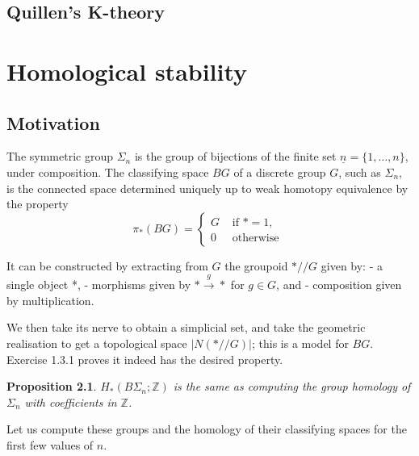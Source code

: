 \documentclass{book}
\newtheorem{prop}{Proposition}
\begin{document}
\section{Quillen's K-theory}



\chapter{Homological stability}

\section{Motivation}

The symmetric group $\Sigma_n$ is the group of bijections of the finite set $\underline{n}=\{1, \ldots, n\}$, under composition. The classifying space $B G$ of a discrete group $G$, such as $\Sigma_n$, is the connected space determined uniquely up to weak homotopy equivalence by the property
$$
\pi_*(B G)= \begin{cases}G & \text { if } *=1, \\ 0 & \text { otherwise }\end{cases}
$$

It can be constructed by extracting from $G$ the groupoid $* / / G$ given by:
- a single object *,
- morphisms given by $* \xrightarrow{g} *$ for $g \in G$, and
- composition given by multiplication.

We then take its nerve to obtain a simplicial set, and take the geometric realisation to get a topological space $|N(* / / G)|$; this is a model for $B G$. Exercise 1.3.1 proves it indeed has the desired property.


\begin{prop}
    $H_*\left(B \Sigma_n ; \mathbb{Z}\right)$  is the same as computing the group homology of $\Sigma_n$ with coefficients in $\mathbb{Z}$.
\end{prop}
Let us compute these groups and the homology of their classifying spaces for the first few values of $n$.
\end{document}
